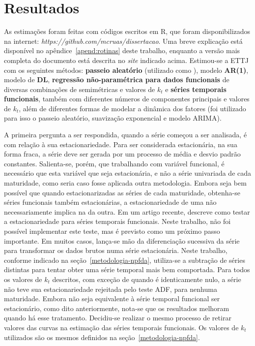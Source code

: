 \documentclass[
	12pt,				%
	openright,			%
	oneside,			%
	a4paper,			%
	english,			%
	brazil				%
	]{dissertacao-ufrgs-abntex2}
\begin{document}
\chapter{Resultados} \label{ch:resultados}

As estimações foram feitas com códigos escritos em R, que foram disponibilizados na internet: \emph{https://github.com/mcruas/dissertacao}. Uma breve  explicação está 
disponível no apêndice~\ref{apend:rotinas} deste trabalho, enquanto a versão mais completa do documento está descrita no \emph{site} indicado acima. 
Estimou-se a ETTJ com os seguintes métodos: \textbf{passeio aleatório} (utilizado como \bm ), modelo \textbf{AR(1)}, modelo de \textbf{DL}, \textbf{regressão não-paramétrica para dados funcionais} de diversas combinações de semimétricas e valores de $k_t$ e \textbf{séries temporais funcionais}, também com diferentes números de componentes principais e valores de $k_t$, além de diferentes formas de modelar a dinâmica dos fatores (foi utilizado para isso o passeio aleatório, suavização exponencial e modelo ARIMA).

A primeira pergunta a ser respondida, quando a série começou a ser analisada, é com relação à sua estacionariedade. Para ser considerada estacionária, na sua forma fraca, a série deve ser gerada por um processo de média e desvio padrão constantes. 
Salienta-se, porém, que trabalhando com variável funcional, é necessário que esta variável que seja estacionária, e não a série univariada de cada maturidade, como seria caso fosse aplicada outra metodologia. Embora seja bem possível que quando estacionarizadas as séries de cada maturidade, obtenha-se séries funcionais também estacionárias, a estacionariedade de uma não necessariamente implica na da outra. 
Em um artigo recente,  descreve como testar a estacionariedade para séries temporais funcionais. Neste trabalho, não foi possível implementar este teste, mas é previsto como um próximo passo importante.
Em muitos casos, lança-se mão da diferenciação sucessiva da série para transformar os dados brutos numa série estacionária. Neste trabalho, conforme indicado na seção~\ref{metodologia-npfda}, utiliza-se a subtração de séries distintas para tentar obter uma série temporal mais bem comportada. 
Para todos os valores de $k_t$ descritos, com exceção de quando é identicamente nulo, a série não teve sua estacionariedade rejeitada pelo teste ADF, para nenhuma maturidade. Embora não seja equivalente à série temporal funcional ser estacionário, como dito anteriormente, nota-se que os resultados melhoram quando há esse tratamento. Decidiu-se realizar o mesmo processo de retirar valores das curvas na estimação das séries temporais funcionais. Os valores de $k_t$ utilizados são os mesmos definidos na seção~\ref{metodologia-npfda}.
\end{document}
